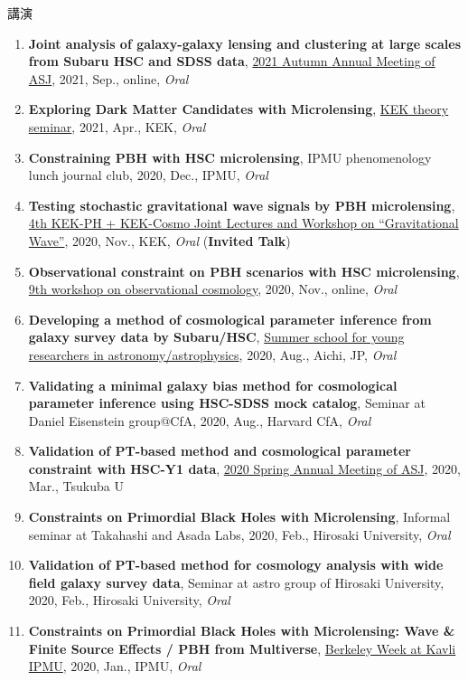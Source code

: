 \begin{rSection}{講演}
\begin{enumerate}[itemsep=0pt, parsep=0pt, topsep=0pt, partopsep=0pt]
\item \textbf{Joint analysis of galaxy-galaxy lensing and clustering at large scales from Subaru HSC and SDSS data}, \href{https://www.asj.or.jp/nenkai/archive/2021b/pdf/U05a.pdf}{2021 Autumn Annual Meeting of ASJ}, 2021, Sep., online, \textit{Oral}
\item \textbf{Exploring Dark Matter Candidates with Microlensing}, \href{https://www.kek.jp/ja/conference/20210407-3/}{KEK theory seminar}, 2021, Apr., KEK, \textit{Oral}
\item \textbf{Constraining PBH with HSC microlensing}, IPMU phenomenology lunch journal club, 2020, Dec., IPMU, \textit{Oral}
\item \textbf{Testing stochastic gravitational wave signals by PBH microlensing}, \href{http://conference-indico.kek.jp/event/117/timetable/#day-2020-11-04}{4th KEK-PH + KEK-Cosmo Joint Lectures and Workshop on ``Gravitational Wave''}, 2020, Nov., KEK, \textit{Oral} (\textbf{Invited Talk})
\item \textbf{Observational constraint on PBH scenarios with HSC microlensing}, \href{https://indico.ipmu.jp/event/382/timetable/#all}{9th workshop on observational cosmology}, 2020, Nov., online, \textit{Oral}
\item \textbf{Developing a method of cosmological parameter inference from galaxy survey data by Subaru/HSC}, \href{http://www.astro-wakate.org/ss2019/web/}{Summer school for young researchers in astronomy/astrophysics}, 2020, Aug., Aichi, JP, \textit{Oral}
\item \textbf{Validating a minimal galaxy bias method for cosmological parameter inference using HSC-SDSS mock catalog}, Seminar at Daniel Eisenstein group@CfA, 2020, Aug., Harvard CfA, \textit{Oral}
\item \textbf{Validation of PT-based method and cosmological parameter constraint with HSC-Y1 data}, \href{http://www.asj.or.jp/nenkai/archive/2020a/pdf/U03a.pdf}{2020 Spring Annual Meeting of ASJ}, 2020, Mar., Tsukuba U
\item \textbf{Constraints on Primordial Black Holes with Microlensing}, Informal seminar at Takahashi and Asada Labs, 2020, Feb., Hirosaki University, \textit{Oral}
\item \textbf{Validation of PT-based method for cosmology analysis with wide field galaxy survey data}, Seminar at astro group of Hirosaki University, 2020, Feb., Hirosaki University, \textit{Oral}
\item \textbf{Constraints on Primordial Black Holes with Microlensing: Wave \& Finite Source Effects / PBH from Multiverse}, \href{http://indico.ipmu.jp/event/313/overview}{Berkeley Week at Kavli IPMU}, 2020, Jan., IPMU, \textit{Oral}

\end{enumerate}
\end{rSection}
